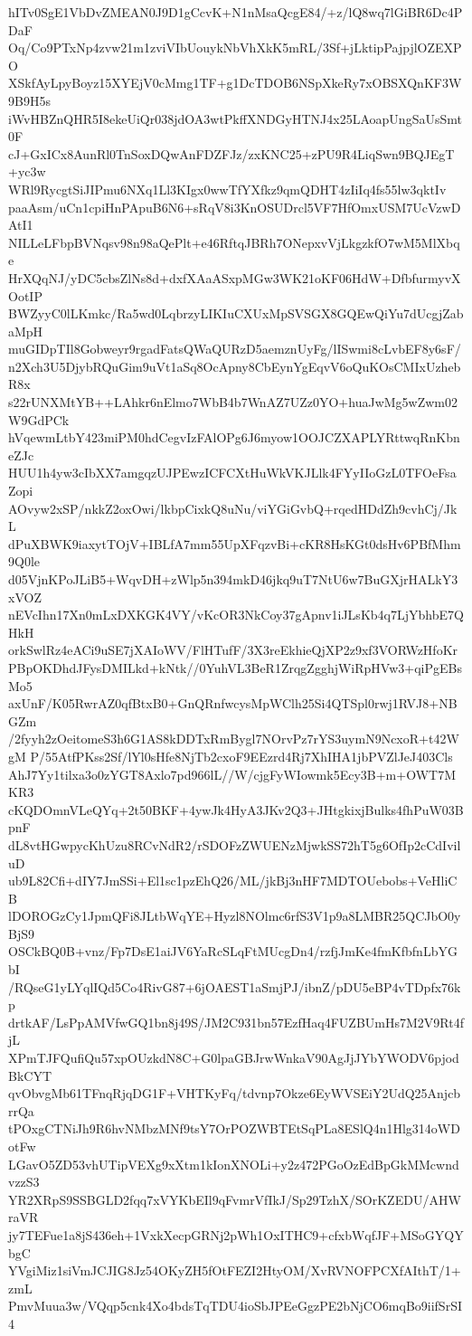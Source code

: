 hITv0SgE1VbDvZMEAN0J9D1gCcvK+N1nMsaQcgE84/+z/lQ8wq7lGiBR6Dc4PDaF
Oq/Co9PTxNp4zvw21m1zviVIbUouykNbVhXkK5mRL/3Sf+jLktipPajpjlOZEXPO
XSkfAyLpyBoyz15XYEjV0cMmg1TF+g1DcTDOB6NSpXkeRy7xOBSXQnKF3W9B9H5s
iWvHBZnQHR5I8ekeUiQr038jdOA3wtPkffXNDGyHTNJ4x25LAoapUngSaUsSmt0F
cJ+GxICx8AunRl0TnSoxDQwAnFDZFJz/zxKNC25+zPU9R4LiqSwn9BQJEgT+yc3w
WRl9RycgtSiJIPmu6NXq1Ll3KIgx0wwTfYXfkz9qmQDHT4zIiIq4fs55lw3qktIv
paaAsm/uCn1cpiHnPApuB6N6+sRqV8i3KnOSUDrcl5VF7HfOmxUSM7UcVzwDAtI1
NILLeLFbpBVNqsv98n98aQePlt+e46RftqJBRh7ONepxvVjLkgzkfO7wM5MlXbqe
HrXQqNJ/yDC5cbsZlNs8d+dxfXAaASxpMGw3WK21oKF06HdW+DfbfurmyvXOotIP
BWZyyC0lLKmkc/Ra5wd0LqbrzyLIKIuCXUxMpSVSGX8GQEwQiYu7dUcgjZabaMpH
muGIDpTIl8Gobweyr9rgadFatsQWaQURzD5aemznUyFg/lISwmi8cLvbEF8y6sF/
n2Xch3U5DjybRQuGim9uVt1aSq8OcApny8CbEynYgEqvV6oQuKOsCMIxUzhebR8x
s22rUNXMtYB++LAhkr6nElmo7WbB4b7WnAZ7UZz0YO+huaJwMg5wZwm02W9GdPCk
hVqewmLtbY423miPM0hdCegvIzFAlOPg6J6myow1OOJCZXAPLYRttwqRnKbneZJc
HUU1h4yw3cIbXX7amgqzUJPEwzICFCXtHuWkVKJLlk4FYyIIoGzL0TFOeFsaZopi
AOvyw2xSP/nkkZ2oxOwi/lkbpCixkQ8uNu/viYGiGvbQ+rqedHDdZh9cvhCj/JkL
dPuXBWK9iaxytTOjV+IBLfA7mm55UpXFqzvBi+cKR8HsKGt0dsHv6PBfMhm9Q0le
d05VjnKPoJLiB5+WqvDH+zWlp5n394mkD46jkq9uT7NtU6w7BuGXjrHALkY3xVOZ
nEVcIhn17Xn0mLxDXKGK4VY/vKcOR3NkCoy37gApnv1iJLsKb4q7LjYbhbE7QHkH
orkSwlRz4eACi9uSE7jXAIoWV/FlHTufF/3X3reEkhieQjXP2z9xf3VORWzHfoKr
PBpOKDhdJFysDMILkd+kNtk//0YuhVL3BeR1ZrqgZgghjWiRpHVw3+qiPgEBsMo5
axUnF/K05RwrAZ0qfBtxB0+GnQRnfwcysMpWClh25Si4QTSpl0rwj1RVJ8+NBGZm
/2fyyh2zOeitomeS3h6G1AS8kDDTxRmBygl7NOrvPz7rYS3uymN9NcxoR+t42WgM
P/55AtfPKss2Sf/lYl0sHfe8NjTb2cxoF9EEzrd4Rj7XhIHA1jbPVZlJeJ403Cls
AhJ7Yy1tilxa3o0zYGT8Axlo7pd966lL//W/cjgFyWIowmk5Ecy3B+m+OWT7MKR3
cKQDOmnVLeQYq+2t50BKF+4ywJk4HyA3JKv2Q3+JHtgkixjBulks4fhPuW03BpnF
dL8vtHGwpycKhUzu8RCvNdR2/rSDOFzZWUENzMjwkSS72hT5g6OfIp2cCdIviluD
ub9L82Cfi+dIY7JmSSi+El1sc1pzEhQ26/ML/jkBj3nHF7MDTOUebobs+VeHliCB
lDOROGzCy1JpmQFi8JLtbWqYE+Hyzl8NOlmc6rfS3V1p9a8LMBR25QCJbO0yBjS9
OSCkBQ0B+vnz/Fp7DsE1aiJV6YaRcSLqFtMUcgDn4/rzfjJmKe4fmKfbfnLbYGbI
/RQseG1yLYqlIQd5Co4RivG87+6jOAEST1aSmjPJ/ibnZ/pDU5eBP4vTDpfx76kp
drtkAF/LsPpAMVfwGQ1bn8j49S/JM2C931bn57EzfHaq4FUZBUmHs7M2V9Rt4fjL
XPmTJFQufiQu57xpOUzkdN8C+G0lpaGBJrwWnkaV90AgJjJYbYWODV6pjodBkCYT
qvObvgMb61TFnqRjqDG1F+VHTKyFq/tdvnp7Okze6EyWVSEiY2UdQ25AnjcbrrQa
tPOxgCTNiJh9R6hvNMbzMNf9tsY7OrPOZWBTEtSqPLa8ESlQ4n1Hlg314oWDotFw
LGavO5ZD53vhUTipVEXg9xXtm1kIonXNOLi+y2z472PGoOzEdBpGkMMcwndvzzS3
YR2XRpS9SSBGLD2fqq7xVYKbEIl9qFvmrVfIkJ/Sp29TzhX/SOrKZEDU/AHWraVR
jy7TEFue1a8jS436eh+1VxkXecpGRNj2pWh1OxITHC9+cfxbWqfJF+MSoGYQYbgC
YVgiMiz1siVmJCJIG8Jz54OKyZH5fOtFEZI2HtyOM/XvRVNOFPCXfAIthT/1+zmL
PmvMuua3w/VQqp5cnk4Xo4bdsTqTDU4ioSbJPEeGgzPE2bNjCO6mqBo9iifSrSI4
